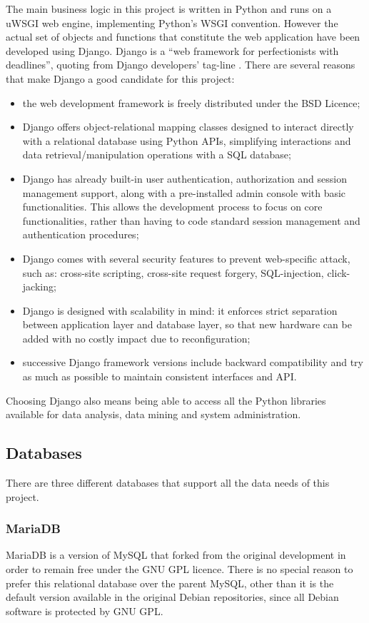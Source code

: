 The main business logic in this project is written in Python and runs on a uWSGI
web engine, implementing Python's WSGI convention. However the actual set of
objects and functions that constitute the web application have been developed
using Django. Django is a ``web framework for perfectionists with deadlines'',
quoting from Django developers' tag-line \cite{Django}. There are several
reasons that make Django a good candidate for this project:
\begin{itemize}
  \item the web development framework is freely distributed under the BSD
  Licence;
  \item Django offers object-relational mapping classes designed to interact
  directly with a relational database using Python APIs, simplifying
  interactions and data retrieval/manipulation operations with a SQL
  database;
  \item Django has already built-in user authentication, authorization and
  session management support, along with a pre-installed admin console with basic
  functionalities. This allows the development process to focus on core
  functionalities, rather than having to code standard session management and
  authentication procedures;
  \item Django comes with several security features to prevent web-specific
  attack, such as: cross-site scripting, cross-site request forgery,
  SQL-injection, click-jacking;
  \item Django is designed with scalability in mind: it enforces strict
  separation between application layer and database layer, so that new hardware
  can be added with no costly impact due to reconfiguration;
  \item successive Django framework versions include backward compatibility and
  try as much as possible to maintain consistent interfaces and API.
\end{itemize}

Choosing Django also means being able to access all the Python libraries
available for data analysis, data mining and system administration.

\subsection{Databases}
There are three different databases that support all the data needs of this
project.

\subsubsection{MariaDB}
MariaDB is a version of MySQL that forked from the original development in order
to remain free under the GNU GPL licence. There is no special reason to prefer
this relational database over the parent MySQL, other than it is the default
version available in the original Debian repositories, since all Debian software
is protected by GNU GPL.

